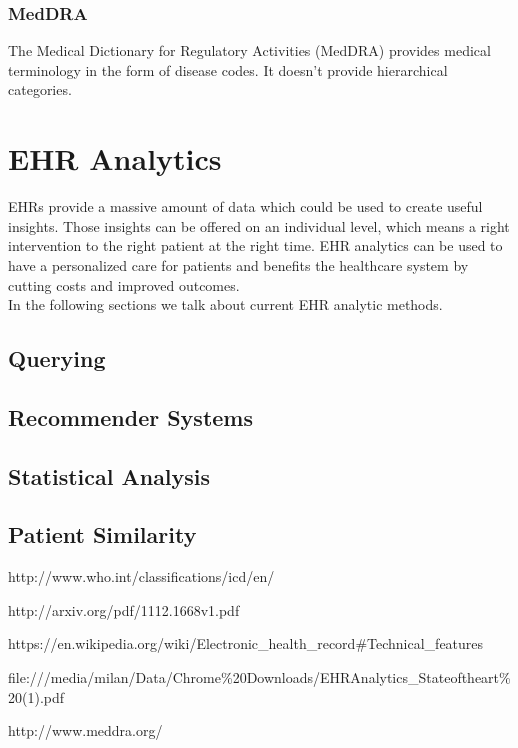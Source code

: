 \subsubsection{MedDRA}

The Medical Dictionary for Regulatory Activities (MedDRA) provides medical terminology in the form of disease codes. It doesn't provide hierarchical categories.

\section{EHR Analytics}

EHRs provide a massive amount of data which could be used to create useful insights. Those insights can be offered on an individual level, which means a right intervention to the right patient at the right time. EHR analytics can be used to have a personalized care for patients and benefits the healthcare system by cutting costs and improved outcomes. \\

In the following sections we talk about current EHR analytic methods.


\subsection{Querying}



\subsection{Recommender Systems}

\subsection{Statistical Analysis}

\subsection{Patient Similarity}


http://www.who.int/classifications/icd/en/

http://arxiv.org/pdf/1112.1668v1.pdf

https://en.wikipedia.org/wiki/Electronic\_health\_record#Technical\_features

file:///media/milan/Data/Chrome\%20Downloads/EHRAnalytics_Stateoftheart\%20(1).pdf

http://www.meddra.org/

